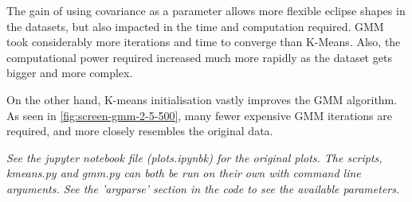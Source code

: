 \documentclass[11pt,openright,a4paper]{article}
\numberwithin{equation}{section}
\begin{document}
The gain of using covariance as a parameter allows more flexible eclipse shapes in the datasets, but also impacted in the time and computation required. GMM took considerably more iterations and time to converge than K-Means. Also, the computational power required increased much more rapidly as the dataset gets bigger and more complex.

On the other hand, K-means initialisation vastly improves the GMM algorithm. As seen in \autoref{fig:screen-gmm-2-5-500}, many fewer expensive GMM iterations are required, and more closely resembles the original data.

\textit{See the jupyter notebook file (plots.ipynbk) for the original plots. The scripts, kmeans.py and gmm.py can both be run on their own with command line arguments. See the 'argparse' section in the code to see the available parameters.}


\printbibliography
\end{document}
